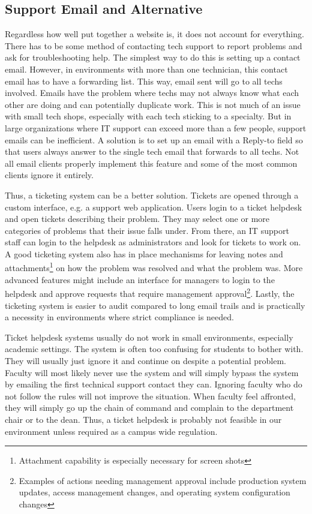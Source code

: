 \subsection{Support Email and Alternative}

Regardless how well put together a website is, it does not account for everything.  There has to be some method of contacting tech support to report problems and ask for troubleshooting help.  The simplest way to do this is setting up a contact email.  However, in environments with more than one technician, this contact email has to have a forwarding list.  This way, email sent will go to all techs involved.   Emails have the problem where techs may not always know what each other are doing and can potentially duplicate work.  This is not much of an issue with small tech shops, especially with each tech sticking to a specialty.  But in large organizations where IT support can exceed more than a few people, support emails can be inefficient.  A solution is to set up an email with a Reply-to field so that users always answer to the single tech email that forwards to all techs.  Not all email clients properly implement this feature and some of the most common clients ignore it entirely.

Thus, a ticketing system can be a better solution.  Tickets are opened through a custom interface, e.g. a support web application.  Users login to a ticket helpdesk and open tickets describing their problem.  They may select one or more categories of problems that their issue falls under.  From there, an IT support staff can login to the helpdesk as administrators and look for tickets to work on.  A good ticketing system also has in place mechanisms for leaving notes and attachments\footnote{Attachment capability is especially necessary for screen shots} on how the problem was resolved and what the problem was.  More advanced features might include an interface for managers to login to the helpdesk and approve requests that require management approval\footnote{Examples of actions needing management approval include production system updates, access management changes, and operating system configuration changes}.  Lastly, the ticketing system is easier to audit compared to long email trails and is practically a necessity in environments where strict compliance is needed.   

Ticket helpdesk systems usually do not work in small environments, especially academic settings.  The system is often too confusing for students to bother with.  They will usually just ignore it and continue on despite a potential problem.  Faculty will most likely never use the system and will simply bypass the system by emailing the first technical support contact they can.  Ignoring faculty who do not follow the rules will not improve the situation.  When faculty feel affronted, they will simply go up the chain of command and complain to the department chair or to the dean.  Thus, a ticket helpdesk is probably not feasible in our environment unless required as a campus wide regulation.  

